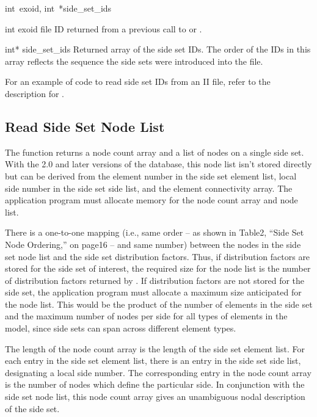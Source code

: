 {int~exoid,
int~*side_set_ids}

\begin{parameters}
\item[{int exoid \R{}}]
\exo{} file ID returned from a previous call to  or
.

\item[{int* side_set_ids \W{}}]
Returned array of the side set IDs. The order of the IDs in this array
reflects the sequence the side sets were introduced into the file.
\end{parameters}

For an example of code to read side set IDs from an \exo{} II file,
refer to the description for .

\subsection{Read Side Set Node List}

The function  returns a node
count array and a list of nodes on a single side set. With the 2.0 and
later versions of the database, this node list isn't stored directly
but can be derived from the element number in the side set element
list, local side number in the side set side list, and the element
connectivity array. The application program must allocate memory for
the node count array and node list.

There is a one-to-one mapping (i.e., same order -- as shown in
Table{\nobreakspace}2, ``Side Set Node Ordering,'' on
page{\nobreakspace}16 -- and same number) between the nodes in the
side set node list and the side set distribution factors. Thus, if
distribution factors are stored for the side set of interest, the
required size for the node list is the number of distribution factors
returned by . If distribution factors
are not stored for the side set, the application program must allocate
a maximum size anticipated for the node list. This would be the
product of the number of elements in the side set and the maximum
number of nodes per side for all types of elements in the model, since
side sets can span across different element types.

The length of the node count array is the length of the side set
element list. For each entry in the side set element list, there is an
entry in the side set side list, designating a local side number. The
corresponding entry in the node count array is the number of nodes
which define the particular side. In conjunction with the side set
node list, this node count array gives an unambiguous nodal
description of the side set.


